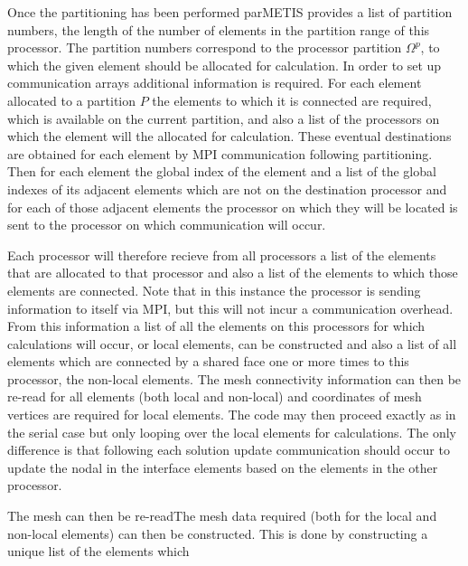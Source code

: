 Once the partitioning has been performed parMETIS provides a list of partition numbers, the length of the number of elements in the partition range of this processor. The partition numbers correspond to the processor partition $\Omega^p$, to which the given element should be allocated for calculation. In order to set up communication arrays additional information is required. For each element allocated to a partition $P$ the elements to which it is connected are required, which is available on the current partition, and also a list of the processors on which the element will the allocated for calculation. These eventual destinations are obtained for each element by MPI communication following partitioning. Then for each element the global index of the element and a list of the global indexes of its adjacent elements which are not on the destination processor and for each of those adjacent elements the processor on which they will be located is sent to the processor on which communication will occur.

Each processor will therefore recieve from all processors a list of the elements that are allocated to that processor and also a list of the elements to which those elements are connected. Note that in this instance the processor is sending information to itself via MPI, but this will not incur a communication overhead. From this information a list of all the elements on this processors for which calculations will occur, or local elements, can be constructed and also a list of all elements which are connected by a shared face one or more times to this processor, the non-local elements. The mesh connectivity information can then be re-read for all elements (both local and non-local) and coordinates of mesh vertices are required for local elements. The code may then proceed exactly as in the serial case but only looping over the local elements for calculations. The only difference is that following each solution update communication should occur to update the nodal in the interface elements based on the elements in the other processor.



The mesh can then be re-readThe mesh data required (both for the local and non-local elements) can then be constructed. This is done by constructing a unique list of the elements which

